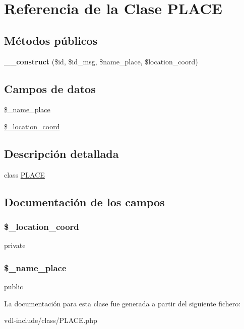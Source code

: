\hypertarget{class_p_l_a_c_e}{\section{Referencia de la Clase P\-L\-A\-C\-E}
\label{class_p_l_a_c_e}
}
\subsection*{Métodos públicos}
\begin{DoxyCompactItemize}
\item 
\hypertarget{class_p_l_a_c_e_aa12a74886b49e2476b79dce3c7c0d91c}{{\bfseries \-\_\-\-\_\-construct} (\$id, \$id\-\_\-msg, \$name\-\_\-place, \$location\-\_\-coord)}\label{class_p_l_a_c_e_aa12a74886b49e2476b79dce3c7c0d91c}

\end{DoxyCompactItemize}
\subsection*{Campos de datos}
\begin{DoxyCompactItemize}
\item 
\hyperlink{class_p_l_a_c_e_ab605e159ffb78f4b4cabe8c76dd99775}{\$\-\_\-name\-\_\-place}
\item 
\hyperlink{class_p_l_a_c_e_a1d8307db55f9b8f1b2e1a5730c5d39a3}{\$\-\_\-location\-\_\-coord}
\end{DoxyCompactItemize}


\subsection{Descripción detallada}
class \hyperlink{class_p_l_a_c_e}{P\-L\-A\-C\-E} 

\subsection{Documentación de los campos}
\hypertarget{class_p_l_a_c_e_a1d8307db55f9b8f1b2e1a5730c5d39a3}{
\subsubsection[{\$\-\_\-location\-\_\-coord}]{\setlength{\rightskip}{0pt plus 5cm}\$\-\_\-location\-\_\-coord}}\label{class_p_l_a_c_e_a1d8307db55f9b8f1b2e1a5730c5d39a3}
private \hypertarget{class_p_l_a_c_e_ab605e159ffb78f4b4cabe8c76dd99775}{
\subsubsection[{\$\-\_\-name\-\_\-place}]{\setlength{\rightskip}{0pt plus 5cm}\$\-\_\-name\-\_\-place}}\label{class_p_l_a_c_e_ab605e159ffb78f4b4cabe8c76dd99775}
public 

La documentación para esta clase fue generada a partir del siguiente fichero\-:\begin{DoxyCompactItemize}
\item 
vdl-\/include/class/P\-L\-A\-C\-E.\-php\end{DoxyCompactItemize}
